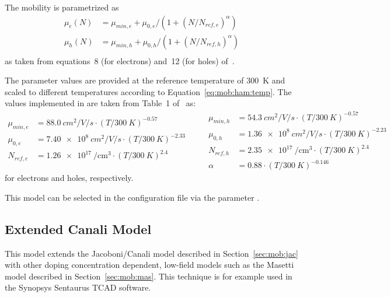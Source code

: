 The mobility is parametrized as
\begin{equation}
    \label{eq:mob:aro}
    \begin{split}
        \mu_e(N) &= \mu_{min,e} + \mu_{0,e} / \left(1 + (N / N_{ref,e})^{\alpha}\right)\\
        \mu_h(N) &= \mu_{min,h} + \mu_{0,h} / \left(1 + (N / N_{ref,h})^{\alpha}\right)\\
    \end{split}
\end{equation}
as taken from equations~8 (for electrons) and~12 (for holes) of~\cite{arora}.

The parameter values are provided at the reference temperature of \SI{300}{K} and scaled to different temperatures according to Equation~\eqref{eq:mob:ham:temp}.
The values implemented in \apsq are taken from Table~1 of~\cite{arora} as:
\begin{equation*}
    \begin{split}
        \mu_{min,e} &= \SI{88.0}{cm^2 \per V \per s} \cdot (T / \SI{300}{K})^{-0.57}\\
        \mu_{0,e}   &= \SI{7.40e8}{cm^2 \per V \per s} \cdot (T / \SI{300}{K})^{-2.33}\\
        N_{ref,e}   &= \SI{1.26e17}{\per \cubic \cm} \cdot (T / \SI{300}{K})^{2.4}\\
    \end{split}
    \qquad
    \begin{split}
        \mu_{min,h} &= \SI{54.3}{cm^2 \per V \per s} \cdot (T / \SI{300}{K})^{-0.57}\\
        \mu_{0,h}   &= \SI{1.36e8}{cm^2 \per V \per s} \cdot (T / \SI{300}{K})^{-2.23}\\
        N_{ref,h}   &= \SI{2.35e17}{\per \cubic \cm} \cdot (T / \SI{300}{K})^{2.4}\\
        \alpha   &= 0.88 \cdot (T / \SI{300}{K})^{-0.146}
    \end{split}
\end{equation*}
for electrons and holes, respectively.

This model can be selected in the configuration file via the parameter .

\subsection{Extended Canali Model}

This model extends the Jacoboni/Canali model described in Section~\ref{sec:mob:jac} with other doping concentration dependent, low-field models such as the Masetti model described in Section~\ref{sec:mob:mas}.
This technique is for example used in the Synopsys Sentaurus TCAD software.

